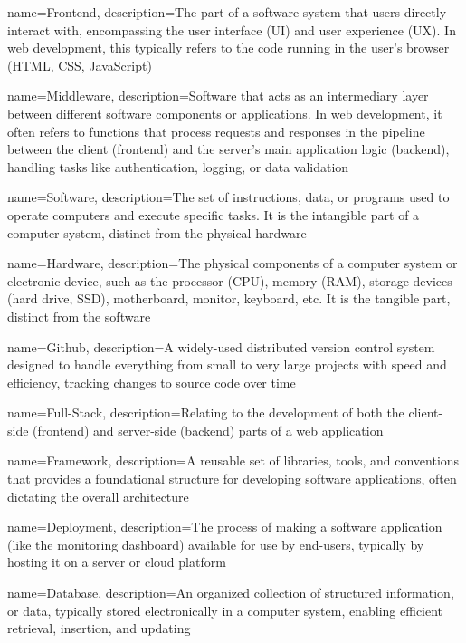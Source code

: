 {
    name=Frontend,
    description={The part of a software system that users directly interact with, encompassing the user interface (UI) and user experience (UX). In web development, this typically refers to the code running in the user's browser (HTML, CSS, JavaScript)}
}

{
    name=Middleware,
    description={Software that acts as an intermediary layer between different software components or applications. In web development, it often refers to functions that process requests and responses in the pipeline between the client (frontend) and the server's main application logic (backend), handling tasks like authentication, logging, or data validation}
}

{
    name=Software,
    description={The set of instructions, data, or programs used to operate computers and execute specific tasks. It is the intangible part of a computer system, distinct from the physical hardware}
}

{
    name=Hardware,
    description={The physical components of a computer system or electronic device, such as the processor (CPU), memory (RAM), storage devices (hard drive, SSD), motherboard, monitor, keyboard, etc. It is the tangible part, distinct from the software}
}

{
    name=Github,
    description={A widely-used distributed version control system designed to handle everything from small to very large projects with speed and efficiency, tracking changes to source code over time}
}

{
    name=Full-Stack,
    description={Relating to the development of both the client-side (frontend) and server-side (backend) parts of a web application}
}

{
    name=Framework,
    description={A reusable set of libraries, tools, and conventions that provides a foundational structure for developing software applications, often dictating the overall architecture}
}


{
    name=Deployment,
    description={The process of making a software application (like the monitoring dashboard) available for use by end-users, typically by hosting it on a server or cloud platform}
}

{
    name=Database,
    description={An organized collection of structured information, or data, typically stored electronically in a computer system, enabling efficient retrieval, insertion, and updating}
}


